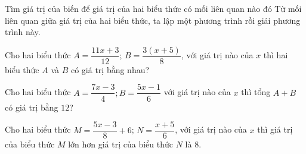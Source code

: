 \begin{dang}{Tìm giá trị của biến để giá trị của hai biểu thức có mối liên quan nào đó}
	Từ mối liên quan giữa giá trị của hai biểu thức, ta lập một phương trình rồi giải phương trình này.
\end{dang}
\begin{vd}%
	Cho hai biểu thức $A=\dfrac{11x+3}{12}$; $B=\dfrac{3\left(x+5\right)}{8}$, với giá trị nào của $x$ thì hai biểu thức $A$ và $B$ có giá trị bằng nhau?
\end{vd}
\begin{vd}%
	Cho hai biểu thức $A=\dfrac{7x-3}{4};B=\dfrac{5x-1}{6}$ với giá trị nào của $x$ thì tổng $A+B$ có giá trị bằng $12$?
\end{vd}
\begin{vd}%
	Cho hai biểu thức $M=\dfrac{5x-3}{8}+6$; $N=\dfrac{x+5}{6}$, với giá trị nào của $x$ thì giá trị của biểu thức $M$ lớn hơn giá trị của biểu thức $N$ là $8$.
\end{vd}

